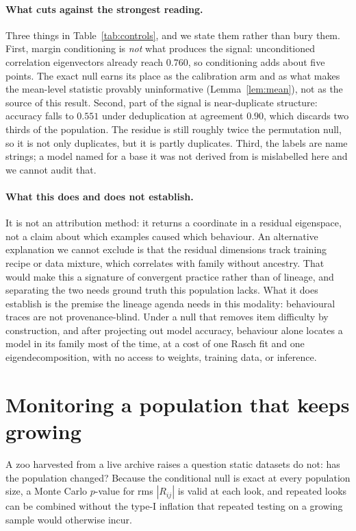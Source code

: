 \documentclass{article}
\begin{document}
\paragraph{What cuts against the strongest reading.} Three things in Table~\ref{tab:controls}, and
we state them rather than bury them. First, margin conditioning is \emph{not} what produces the
signal: unconditioned correlation eigenvectors already reach $0.760$, so conditioning adds about
five points. The exact null earns its place as the calibration arm and as what makes the mean-level
statistic provably uninformative (Lemma~\ref{lem:mean}), not as the source of this result. Second,
part of the signal is near-duplicate structure: accuracy falls to $0.551$ under deduplication at
agreement $0.90$, which discards two thirds of the population. The residue is still roughly twice
the permutation null, so it is not only duplicates, but it is partly duplicates. Third, the labels
are name strings; a model named for a base it was not derived from is mislabelled here and we
cannot audit that.

\paragraph{What this does and does not establish.} It is not an attribution method: it returns a
coordinate in a residual eigenspace, not a claim about which examples caused which behaviour. An
alternative explanation we cannot exclude is that the residual dimensions track training recipe or
data mixture, which correlates with family without ancestry. That would make this a signature of
convergent practice rather than of lineage, and separating the two needs ground truth this
population lacks. What it does establish is the premise the lineage agenda needs in this modality:
behavioural traces are not provenance-blind. Under a null that removes item difficulty by
construction, and after projecting out model accuracy, behaviour alone locates a model in its family
most of the time, at a cost of one Rasch fit and one eigendecomposition, with no access to weights,
training data, or inference.

\section{Monitoring a population that keeps growing}
\label{sec:monitor}

A zoo harvested from a live archive raises a question static datasets do not: has the population
changed? Because the conditional null is exact at every population size, a Monte Carlo $p$-value for
rms $|R_{ij}|$ is valid at each look, and repeated looks can be combined without the type-I
inflation that repeated testing on a growing sample would otherwise incur.
\end{document}
